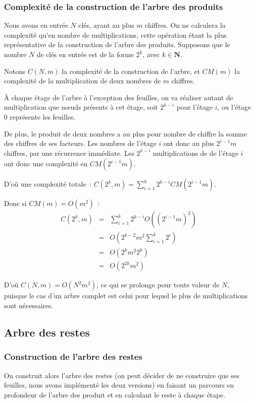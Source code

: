 \documentclass[a4paper,10pt]{article}
\begin{document}
  \subsubsection{Complexité de la construction de l'arbre des produits\label{sn:complexite_arb_prod}}
  Nous avons en entrée $N$ clés, ayant au plus $m$ chiffres.
  On ne calculera la complexité qu'en nombre de multiplications, cette opération étant la plus représentative de la construction de l'arbre des produits.
  Supposons que le nombre $N$ de clés en entrée est de la forme $2^k$, avec $k\in\mathbf{N}$.
  
  Notons $C(N,m)$ la complexité de la construction de l'arbre, et $CM(m)$ la complexité de la multiplication de deux nombres de $m$ chiffres.
  
  À chaque étage de l'arbre à l'exception des feuilles, on va réaliser autant de multiplication que nœuds présents à cet étage, soit $2^{k-i}$ pour l'étage $i$, ou l'étage $0$ représente les feuilles.
  
  De plus, le produit de deux nombres a au plus pour nombre de chiffre la somme des chiffres de ses facteurs.
  Les nombres de l'étage $i$ ont donc au plus $2^{i-1}m$ chiffres, par une récurrence immédiate.
  Les $2^{k-i}$ multiplications de de l'étage $i$ ont donc une complexité en $CM(2^{i-1}m)$.
  
  D'où une complexité totale~: $C(2^k,m) = \sum_{i=1}^k 2^{k-i}CM(2^{i-1}m)$.
  
  Donc si $CM(m) = O(m^2)$~:
  \begin{eqnarray*}
   C(2^k,m) &=& \sum_{i=1}^k 2^{k-i}O({(2^{i-1}m)}^2)\\
   &=& O(2^{k-2}m^2\sum_{i=1}^k 2^i)\\
   &=& O(2^k m^2 2^k)\\
   &=& O(2^{2k} m^2)
  \end{eqnarray*}
  
  D'où $C(N,m) = O(N^2m^2)$, ce qui se prolonge pour toute valeur de $N$, puisque le cas d'un arbre complet est celui pour lequel le plus de multiplications sont nécessaires.
  


  \subsection{Arbre des restes}
  \subsubsection{Construction de l'arbre des restes}
  On construit alors l'arbre des restes (on peut décider de ne construire que ses feuilles, nous avons implémenté les deux versions) en faisant un parcours en profondeur de l'arbre des produit et en calculant le reste à chaque étape.
  
\end{document}
